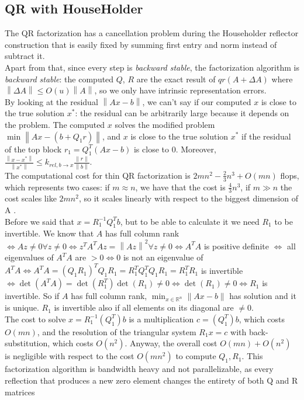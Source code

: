 \documentclass{article}
\begin{document}
\subsection{QR with HouseHolder}\label{subsec:qr-with-householder}
The QR factorization has a cancellation problem during the Householder reflector construction that is easily fixed by summing first entry and norm instead of subtract it.
\\Apart from that, since every step is \textit{backward stable}, the factorization algorithm is \textit{backward stable}: the computed $Q$, $R$ are the exact result of $qr(A + \Delta A)$ where $ \left\lVert \Delta A \right\rVert \leq O(u)\left\lVert A \right\rVert$, so we only have intrinsic representation errors.
\\By looking at the residual $\left\lVert A x - b\right\rVert$, we can't say if our computed $x$ is close to the true solution $x^{*}$: the residual can be arbitrarily large because it depends on the problem.
The computed $x$ solves the modified problem $\min \left\lVert Ax - (b + Q_{1}r)\right\rVert$, and $x$ is close to the true solution $x^{*}$ if the residual of the top block $r_{1} = Q_{1}^{T}(Ax - b)$ is close to 0.
Moreover, $\frac{\left\lVert x - x^{*} \right\rVert}{ \left\lVert x^{*} \right\rVert} \leq k_{rel, b\rightarrow x}\frac{\left\lVert r \right\rVert}{\left\lVert b \right\rVert}$.
\\The computational cost for thin QR factorization is $2mn^2 - \frac{2}{3}n^3 + O(mn)$ flops, which represents two cases: if $m \approx n$, we have that the cost is $\frac{4}{3}n^3$, if $m \gg n$ the cost scales like $2mn^2$, so it scales linearly with respect to the biggest dimension of A .
\\Before we said that $x = R_{1}^{-1}Q_{1}^{T}b$, but to be able to calculate it we need $R_{1}$ to be invertible.
We know that $A$ has full column rank $\iff Az \neq 0 \forall z \neq 0 \iff z^{T}A^{T}Az = \left\lVert Az \right\rVert^{2} \forall z \neq 0 \iff A^{T}A$ is positive definite $\iff$ all eigenvalues of $A^{T}A$ are $> 0\iff $0 is not an eigenvalue of $A^{T}A \iff A^{T}A = (Q_{1}R_{1})^{T}Q_{1}R_{1} = R_{1}^{T}Q_{1}^{T}Q_{1}R_{1} = R_{1}^{T}R_{1}$ is invertible $\iff \det(A^{T}A) = \det(R_{1}^{T})\det(R_{1}) \neq 0 \iff \det(R_{1}) \neq 0 \iff R_{1}$ is invertible.
So if $A$ has full column rank, $\min_{x \in \mathds{R}^n}\|Ax-b\|$ has solution and it is unique.
$R_{1}$ is invertible also if all elements on its diagonal are $\neq 0$.
\\The cost to solve $x = R_{1}^{-1}(Q_{1}^{T})b$ is a multiplication $c = (Q_{1}^{T})b$, which costs $O(mn)$, and the resolution of the triangular system $R_{1}x = c$ with back-substitution, which costs $O(n^{2})$.
Anyway, the overall cost $O(mn) + O(n^{2})$ is negligible with respect to the cost $O(mn^{2})$ to compute $Q_{1}, R_{1}$.
This factorization algorithm is bandwidth heavy and not parallelizable, as every reflection that produces a new zero element changes the entirety of both Q and R matrices
\end{document}
